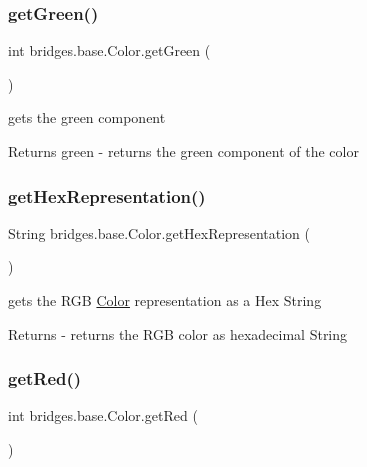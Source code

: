 \subsubsection{\texorpdfstring{get\+Green()}{getGreen()}}
{\footnotesize\ttfamily int bridges.\+base.\+Color.\+get\+Green (\begin{DoxyParamCaption}{ }\end{DoxyParamCaption})}

gets the green component

\begin{DoxyReturn}{Returns}
green -\/ returns the green component of the color 
\end{DoxyReturn}
\mbox{\label{classbridges_1_1base_1_1_color_aced9bc89248b85686ba5385472974fe6}} 
\subsubsection{\texorpdfstring{get\+Hex\+Representation()}{getHexRepresentation()}}
{\footnotesize\ttfamily String bridges.\+base.\+Color.\+get\+Hex\+Representation (\begin{DoxyParamCaption}{ }\end{DoxyParamCaption})}

gets the R\+GB \mbox{\hyperlink{classbridges_1_1base_1_1_color}{Color}} representation as a Hex String

\begin{DoxyReturn}{Returns}
-\/ returns the R\+GB color as hexadecimal String 
\end{DoxyReturn}
\mbox{\label{classbridges_1_1base_1_1_color_af1a30dc925b35d6bfe609f8838651025}} 
\subsubsection{\texorpdfstring{get\+Red()}{getRed()}}
{\footnotesize\ttfamily int bridges.\+base.\+Color.\+get\+Red (\begin{DoxyParamCaption}{ }\end{DoxyParamCaption})}

